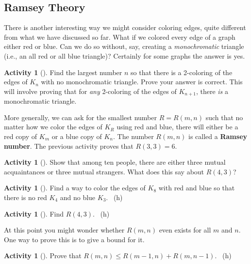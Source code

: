 \documentclass[10pt,]{book}
\newcommand{\terminology}[1]{\textbf{#1}}
\theoremstyle{plain}
\theoremstyle{definition}
\theoremstyle{definition}
\theoremstyle{definition}
\newtheorem{activity}[project]{Activity}
\numberwithin{equation}{chapter}
\begin{document}
\subsection[{Ramsey Theory}]{Ramsey Theory}\label{subsec-}
\hypertarget{p-408}{}%
There is another interesting way we might consider coloring edges, quite different from what we have discussed so far. What if we colored every edge of a graph either red or blue. Can we do so without, say, creating a \emph{monochromatic} triangle (i.e., an all red or all blue triangle)? Certainly for some graphs the answer is yes.%
\begin{activity}[]\label{act_R-3-3}
\hypertarget{p-409}{}%
Find the largest number \(n\) so that there is a 2-coloring of the edges of \(K_n\) with no monochromatic triangle.  Prove your answer is correct.  This will involve proving that for \emph{any} 2-coloring of the edges of \(K_{n+1}\), there \emph{is} a monochromatic triangle.%
\end{activity}
\hypertarget{p-410}{}%
More generally, we can ask for the smallest number \(R = R(m,n)\) such that no matter how we color the edges of \(K_R\) using red and blue, there will either be a red copy of \(K_m\) or a blue copy of \(K_n\).  The number \(R(m,n)\) is called a \terminology{Ramsey number}.  The previous activity proves that \(R(3,3) = 6\).%
\begin{activity}[]\label{activity-42}
\hypertarget{p-411}{}%
Show that among ten people, there are either three mutual acquaintances or three mutual strangers.  What does this say about \(R(4,3)\)?%
\end{activity}
\begin{activity}[]\label{activity-43}
\hypertarget{p-413}{}%
Find a way to color the edges of \(K_8\) with red and blue so that there is no red \(K_4\) and no blue \(K_3\).%
~{\tiny (h)}\end{activity}
\begin{activity}[]\label{activity-44}
\hypertarget{p-415}{}%
Find \(R(4,3)\).%
~{\tiny (h)}\end{activity}
\hypertarget{p-418}{}%
At this point you might wonder whether \(R(m,n)\) even exists for all \(m\) and \(n\).  One way to prove this is to give a bound for it.%
\begin{activity}[]\label{Ramseyrecurrence}
\hypertarget{p-419}{}%
Prove that \(R(m,n)\le R(m-1,n) + R(m,n-1)\).%
~{\tiny (h)}\end{activity}
\end{document}

